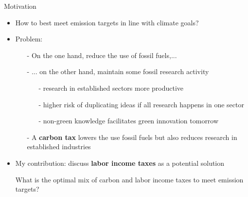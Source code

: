 \documentclass[11pt,aspectratio=169]{beamer}
\begin{document}
\addtocounter{framenumber}{-1}
\begin{frame}{Motivation}
	\begin{itemize}[<+-| alert@+>]
		\item How to best meet emission targets in line with climate goals? %
		\vspace{3mm}
		\item Problem:
		\begin{itemize}
			\item[-] On the one hand,  reduce the use of fossil fuels,...
			\vspace{2mm}
			\item[-] ... on the other hand, %
			 maintain some fossil research activity 
			\vspace{1mm}
			\begin{enumerate}
				\item[-] research in established sectors more productive
				\item[-] higher risk of duplicating ideas if all research happens in one sector
				\item[-] non-green knowledge facilitates green innovation tomorrow %
			\end{enumerate}%
			\vspace{2mm}				
			\item[-] A \textbf{carbon tax} lowers the use fossil fuels but also reduces research in established industries %
		\end{itemize} 
		\vspace{3mm}
		\item My contribution: discuss \textbf{labor income taxes} as a potential solution
		\vspace{3mm}
		\item[] \hspace{-4mm}\alert{{What is the optimal mix of carbon and labor income taxes to meet emission targets?}}
	\end{itemize}
\end{frame}
\end{document}

